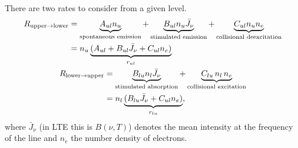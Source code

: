 \documentclass[letterpaper,10pt,english]{sphinxmanual}
\begin{document}
There are two rates to consider from a given level.
\begin{gather}
\begin{split}R_{\textrm{upper}\rightarrow\textrm{lower}} &= \underbrace{A_{ul} n_u}_\textrm{spontaneous emission}
        + \underbrace{B_{ul} n_u \bar{J}_\nu}_\textrm{stimulated emission} +
        \underbrace{C_{ul} n_u n_e}_\textrm{collisional deexcitation}\\
        &= n_u \underbrace{(A_{ul} + B_{ul}\bar{J}_\nu + C_{ul} n_e)}_{r_{ul}} \\\end{split}\notag\\\begin{split}R_{\textrm{lower}\rightarrow\textrm{upper}} &= \underbrace{B_{lu} n_l \bar{J}_\nu}_\textrm{stimulated absorption} +
            \underbrace{C_{lu}\,n_l\,n_e}_\textrm{collisional excitation}\\
            &= n_l \underbrace{(B_{lu}\bar{J}_\nu + C_{ul}n_e)}_{r_{lu}},\end{split}\notag
\end{gather}
where $\bar{J}_\nu$ (in LTE this is $B(\nu, T)$) denotes the mean intensity at the frequency of the line and
$n_e$ the number density of electrons.
\end{document}
